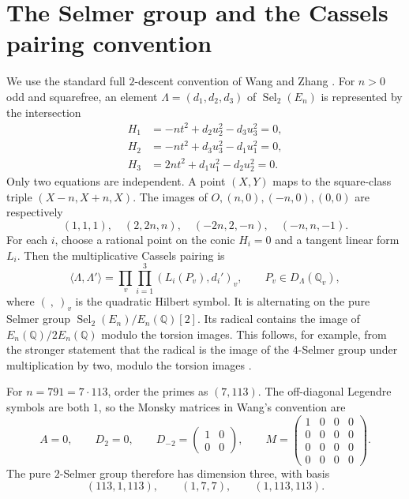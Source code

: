 \documentclass[11pt]{article}
\newcommand{\Q}{\mathbb Q}
\begin{document}
\section{The Selmer group and the Cassels pairing convention}
We use the standard full $2$-descent convention of Wang \cite[Sections 2.1--2.2]{W} and Zhang \cite[Sections 2.1--2.2]{Z}. For $n>0$ odd and squarefree, an element $\Lambda=(d_1,d_2,d_3)$ of $\operatorname{Sel}_2(E_n)$ is represented by the intersection
\begin{align*}
 H_1&=-nt^2+d_2u_2^2-d_3u_3^2=0,\\
 H_2&=-nt^2+d_3u_3^2-d_1u_1^2=0,\\
 H_3&=2nt^2+d_1u_1^2-d_2u_2^2=0.
\end{align*}
Only two equations are independent. A point $(X,Y)$ maps to the square-class triple $(X-n,X+n,X)$. The images of $O,(n,0),(-n,0),(0,0)$ are respectively
\begin{equation}\label{eq:torsion}
 (1,1,1),\quad (2,2n,n),\quad(-2n,2,-n),\quad(-n,n,-1).
\end{equation}
For each $i$, choose a rational point on the conic $H_i=0$ and a tangent linear form $L_i$. Then the multiplicative Cassels pairing is
\begin{equation}\label{eq:pairing}
 \langle\Lambda,\Lambda'\rangle
 =\prod_v\prod_{i=1}^3 (L_i(P_v),d_i')_v,
 \qquad P_v\in D_\Lambda(\Q_v),
\end{equation}
where $(\ ,\ )_v$ is the quadratic Hilbert symbol. It is alternating on the pure Selmer group $\operatorname{Sel}_2(E_n)/E_n(\Q)[2]$. Its radical contains the image of $E_n(\Q)/2E_n(\Q)$ modulo the torsion images. This follows, for example, from the stronger statement that the radical is the image of the $4$-Selmer group under multiplication by two, modulo the torsion images \cite[Section 2.2]{W}.

For $n=791=7\cdot113$, order the primes as $(7,113)$. The off-diagonal Legendre symbols are both $1$, so the Monsky matrices in Wang's convention are
\[
 A=0,\qquad D_2=0,\qquad D_{-2}=\begin{pmatrix}1&0\\0&0\end{pmatrix},
 \qquad
 M=\begin{pmatrix}1&0&0&0\\0&0&0&0\\0&0&0&0\\0&0&0&0\end{pmatrix}.
\]
The pure $2$-Selmer group therefore has dimension three, with basis
\begin{equation}\label{eq:basis}
 (113,1,113),\qquad (1,7,7),\qquad(1,113,113).
\end{equation}
\end{document}
